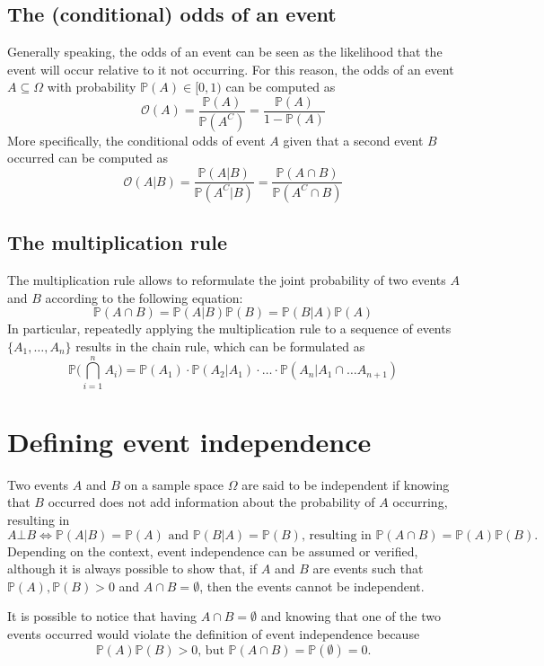 \documentclass{report}
\begin{document}
\subsection{The (conditional) odds of an event}
Generally speaking, the odds of an event can be seen as the likelihood that the event will occur relative to it not occurring. \newline
For this reason, the odds of an event $\displaystyle A \subseteq \Omega$ with probability $\displaystyle \mathbb{P}(A) \in [0, 1)$ can be computed as
\[\mathcal{O}(A) = \frac{\mathbb{P}(A)}{\mathbb{P}(A^C)} = \frac{\mathbb{P}(A)}{1 - \mathbb{P}(A)}\]
More specifically, the conditional odds of event $\displaystyle A$ given that a second event $\displaystyle B$ occurred can be computed as
\[\mathcal{O}(A|B) = \frac{\mathbb{P}(A|B)}{\mathbb{P}(A^C|B)} = \frac{\mathbb{P}(A \cap B)}{\mathbb{P}(A^C \cap B)}\]
\subsection{The multiplication rule}
The multiplication rule allows to reformulate the joint probability of two events $\displaystyle A$ and $\displaystyle B$ according to the following equation:
\[\mathbb{P}(A \cap B) = \mathbb{P}(A|B)\mathbb{P}(B) = \mathbb{P}(B|A)\mathbb{P}(A)\]
In particular, repeatedly applying the multiplication rule to a sequence of events $\displaystyle \{A_1, \dots, A_n\}$ results in the chain rule, which can be formulated as
\[\mathbb{P}\Bigg(\bigcap_{i = 1}^n A_i\Bigg) = \mathbb{P}(A_1)\cdot\mathbb{P}(A_2|A_1)\cdot\dots\cdot\mathbb{P}(A_n|A_1 \cap \dots A_{n + 1})\]
\section{Defining event independence}
Two events $\displaystyle A$ and $\displaystyle B$ on a sample space $\displaystyle \Omega$ are said to be independent if knowing that $\displaystyle B$ occurred does not add information about the probability of $\displaystyle A$ occurring, resulting in
\[A \bot B \Leftrightarrow \mathbb{P}(A|B) = \mathbb{P}(A) \text{ and } \mathbb{P}(B|A) = \mathbb{P}(B) \text{, resulting in $\mathbb{P}(A \cap B) = \mathbb{P}(A)\mathbb{P}(B)$.}\]
Depending on the context, event independence can be assumed or verified, although it is always possible to show that, if $\displaystyle A$ and $\displaystyle B$ are events such that $\displaystyle \mathbb{P}(A), \mathbb{P}(B) > 0$ and $\displaystyle A \cap B = \emptyset$, then the events cannot be independent.
\begin{proofbox}
    It is possible to notice that having $\displaystyle A \cap B = \emptyset$ and knowing that one of the two events occurred would violate the definition of event independence because
    \[\mathbb{P}(A)\mathbb{P}(B) > 0 \text{, but $\mathbb{P}(A \cap B) = \mathbb{P}(\emptyset) = 0$.}\]
\end{proofbox}
\end{document}
